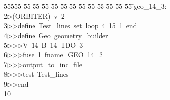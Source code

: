 %
%
\begin{tabbing}
55555 \= 55 \= 55 \= 55 \= 55 \= 55 \= 55 \= 55 \= 55 \= 55 \= 55 \= 55 \= 55 \= \>geo\_14\_3:\\[0pt]
2\>$\triangleright$\>(ORBITER)\ v\ 2\ \\[0pt]
3\>$\triangleright$\>$\triangleright$\>define\ Test\_lines\ set\ loop\ 4\ 15\ 1\ end\ \\[0pt]
4\>$\triangleright$\>$\triangleright$\>define\ Geo\ geometry\_builder\ \\[0pt]
5\>$\triangleright$\>$\triangleright$\>$\triangleright$\>V\ 14\ B\ 14\ TDO\ 3\ \\[0pt]
6\>$\triangleright$\>$\triangleright$\>$\triangleright$\>fuse\ 1\ fname\_GEO\ 14\_3\ \\[0pt]
7\>$\triangleright$\>$\triangleright$\>$\triangleright$\>output\_to\_inc\_file\ \\[0pt]
8\>$\triangleright$\>$\triangleright$\>$\triangleright$\>test\ Test\_lines\ \\[0pt]
9\>$\triangleright$\>$\triangleright$\>end\\[0pt]
10\>\end{tabbing}
